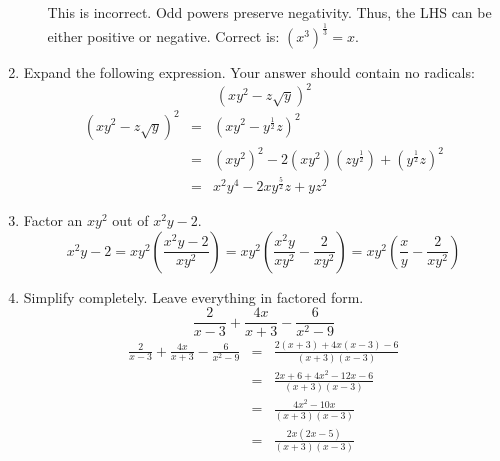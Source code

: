 \documentclass[letterpaper,12pt,fleqn]{article}
\begin{document}
\begin{enumerate}
\begin{enumerate}
    This is incorrect. Odd powers preserve negativity. Thus, the LHS can be
    either positive or negative. Correct is: $\left(x^3\right)^{\frac{1}{3}}=x$.
  \end{enumerate}

\item Expand the following expression. Your answer should contain no radicals:
  \[(xy^2-z\sqrt{y})^2\]
  \begin{eqnarray*}
    (xy^2-z\sqrt{y})^2 &=& (xy^2-y^{\frac{1}{2}}z)^2 \\
    &=& (xy^2)^2-2(xy^2)(zy^{\frac{1}{2}})+(y^{\frac{1}{2}}z)^2 \\
    &=& x^2y^4-2xy^{\frac{5}{2}}z+yz^2
  \end{eqnarray*}

\item Factor an $xy^2$ out of $x^2y-2$.
  \[x^2y-2=xy^2\left(\frac{x^2y-2}{xy^2}\right)=
  xy^2\left(\frac{x^2y}{xy^2}-\frac{2}{xy^2}\right)=
  xy^2\left(\frac{x}{y}-\frac{2}{xy^2}\right)\]

\item Simplify completely. Leave everything in factored form.
  \[\frac{2}{x-3}+\frac{4x}{x+3}-\frac{6}{x^2-9}\]
  \begin{eqnarray*}
    \frac{2}{x-3}+\frac{4x}{x+3}-\frac{6}{x^2-9} &=&
    \frac{2(x+3)+4x(x-3)-6}{(x+3)(x-3)} \\
    &=& \frac{2x+6+4x^2-12x-6}{(x+3)(x-3)} \\
    &=& \frac{4x^2-10x}{(x+3)(x-3)} \\
    &=& \frac{2x(2x-5)}{(x+3)(x-3)}
  \end{eqnarray*}
  
\end{enumerate}
\end{document}

